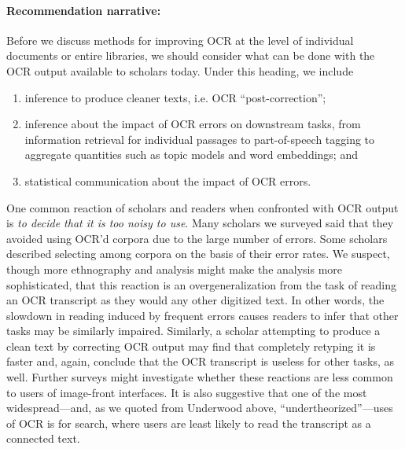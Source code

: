 \documentclass[twoside,11pt]{report}
\begin{document}
\paragraph{Recommendation narrative:}

Before we discuss methods for improving OCR at the level of individual documents or entire libraries, we should consider what can be done with the OCR output available to scholars today. Under this heading, we include
\begin{enumerate}

\item inference to produce cleaner texts, i.e. OCR ``post-correction'';

\item inference about the impact of OCR errors on downstream tasks, from information retrieval for individual passages to part-of-speech tagging to aggregate quantities such as topic models and word embeddings; and

\item statistical communication about the impact of OCR errors.

\end{enumerate}

One common reaction of scholars and readers when confronted with OCR output is \emph{to decide that it is too noisy to use}. Many scholars we surveyed said that they avoided using OCR'd corpora due to the large number of errors. Some scholars described selecting among corpora on the basis of their error rates. We suspect, though more ethnography and analysis might make the analysis more sophisticated, that this reaction is an overgeneralization from the task of reading an OCR transcript as they would any other digitized text. In other words, the slowdown in reading induced by frequent errors causes readers to infer that other tasks may be similarly impaired. Similarly, a scholar attempting to produce a clean text by correcting OCR output may find that completely retyping it is faster and, again, conclude that the OCR transcript is useless for other tasks, as well. Further surveys might investigate whether these reactions are less common to users of image-front interfaces. It is also suggestive that one of the most widespread---and, as we quoted from Underwood above, ``undertheorized''---uses of OCR is for search, where users are least likely to read the transcript as a connected text.
\end{document}
